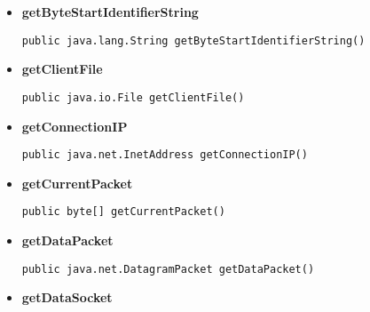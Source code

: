 {{{{{\begin{itemize}
{\hypertarget{filetransferUDP.FileTransfer.getByteStartIdentifier()}{{\bf  getByteStartIdentifier}\\}
\begin{lstlisting}[frame=none]
public byte[] getByteStartIdentifier()\end{lstlisting} %
}%
\item{ 
\hypertarget{filetransferUDP.FileTransfer.getByteStartIdentifierString()}{{\bf  getByteStartIdentifierString}\\}
\begin{lstlisting}[frame=none]
public java.lang.String getByteStartIdentifierString()\end{lstlisting} %
}%
\item{ 
\hypertarget{filetransferUDP.FileTransfer.getClientFile()}{{\bf  getClientFile}\\}
\begin{lstlisting}[frame=none]
public java.io.File getClientFile()\end{lstlisting} %
}%
\item{ 
\hypertarget{filetransferUDP.FileTransfer.getConnectionIP()}{{\bf  getConnectionIP}\\}
\begin{lstlisting}[frame=none]
public java.net.InetAddress getConnectionIP()\end{lstlisting} %
}%
\item{ 
\hypertarget{filetransferUDP.FileTransfer.getCurrentPacket()}{{\bf  getCurrentPacket}\\}
\begin{lstlisting}[frame=none]
public byte[] getCurrentPacket()\end{lstlisting} %
}%
\item{ 
\hypertarget{filetransferUDP.FileTransfer.getDataPacket()}{{\bf  getDataPacket}\\}
\begin{lstlisting}[frame=none]
public java.net.DatagramPacket getDataPacket()\end{lstlisting} %
}%
\item{ 
\hypertarget{filetransferUDP.FileTransfer.getDataSocket()}{{\bf  getDataSocket}\\}
\begin{lstlisting}[frame=none]

\end{lstlisting}}
\end{itemize}}}}}}
